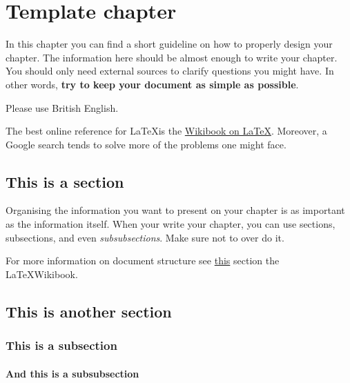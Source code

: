 \documentclass[11pt,a4paper,oneside]{book}
\newcommand{\latex}{\LaTeX{}} %
\begin{document}
\newpage
\tableofcontents
\listoffigures
\listoftables

\mainmatter

\chapter{Template chapter}
\label{ch:template_chapter}
In this chapter you can find a short guideline on how to properly design your chapter. The information here should be almost enough to write your chapter. You should only need external sources to clarify questions you might have. In other words, \textbf{try to keep your document as simple as possible}.

Please use British English.

The best online reference for \latex is the \href{https://en.wikibooks.org/wiki/LaTeX}{Wikibook on \latex}. Moreover, a Google search tends to solve more of the problems one might face.

\section{This is a section}
\label{sec:document_structure}
Organising the information you want to present on your chapter is as important as the information itself. When your write your chapter, you can use sections, subsections, and even \textit{subsubsections}. Make sure not to over do it.

For more information on document structure see \href{https://en.wikibooks.org/wiki/LaTeX/Document_Structure}{this} section the \latex Wikibook.
\section{This is another section}
\subsection{This is a subsection}
\subsubsection{And this is a subsubsection}
\end{document}
